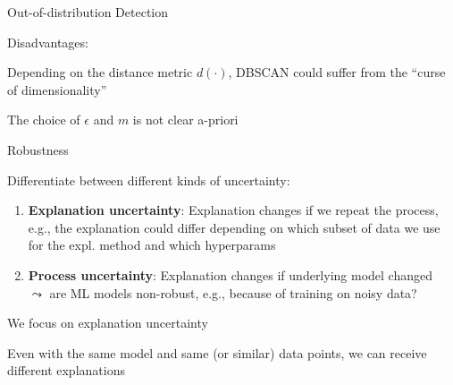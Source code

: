 \documentclass[10pt,compress,t,notes=noshow, xcolor=table]{beamer}
\begin{document}
\begin{framev}[align=top]{Out-of-distribution Detection}
\pause
\begin{itemizeM}
\item Disadvantages:
\begin{itemizeS}
\item Depending on the distance metric $d(\cdot)$, DBSCAN could suffer from the ``curse of dimensionality''
\item The choice of $\epsilon$ and $m$ is not clear a-priori
\end{itemizeS}
\end{itemizeM}
\end{framev}


\begin{framei}[align=top]{Robustness}
\item Differentiate between different kinds of uncertainty:
\begin{enumerate}
\item \textbf{Explanation uncertainty}: Explanation changes if we repeat the process, e.g., the explanation could differ depending on which subset of data we use for the expl. method and which hyperparams 
\pause
\item \textbf{Process uncertainty}: Explanation changes if underlying model changed \\ $\leadsto$ are ML models non-robust, e.g., because of training on noisy data?
\end{enumerate}
\pause
\item We focus on explanation uncertainty
\begin{itemizeS}
\item Even with the same model and same (or similar) data points, we can receive different explanations
\end{itemizeS}
\end{framei}
\end{document}
